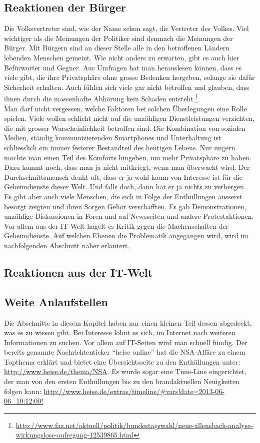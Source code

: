 \subsection{Reaktionen der Bürger}
Die Volksvertreter sind, wie der Name schon sagt, die Vertreter des Volkes. Viel wichtiger als die Meinungen der Politiker sind demnach die Meinungen der Bürger. Mit Bürgern sind an dieser Stelle alle in den betroffenen Ländern lebenden Menschen gemeint. Wie nicht anders zu erwarten, gibt es auch hier Befürworter und Gegner. Aus Umfragen hat man herauslesen können, dass es viele gibt, die ihre Privatsphäre ohne grosse Bedenken hergeben, solange sie dafür Sicherheit erhalten. Auch fühlen sich viele gar nicht betroffen und glauben, dass ihnen durch die massenhafte Abhörung kein Schaden entsteht.\footnote{\url{http://www.faz.net/aktuell/politik/bundestagswahl/neue-allensbach-analyse-wirkungslose-aufregung-12539865.html}}
\\
Man darf nicht vergessen, welche Faktoren bei solchen Überlegungen eine Rolle spielen. Viele wollen schlicht nicht auf die unzähligen Dienstleistungen verzichten, die mit grosser Warscheinlichkeit betroffen sind. Die Kombination von sozialen Medien, ständig kommunizierenden Smartphones und Unterhaltung ist schliesslich ein immer festerer Bestandteil des heutigen Lebens. Nur ungern möchte man einen Teil des Komforts hingeben, um mehr Privatsphäre zu haben. Dazu kommt noch, dass man ja nicht mitkriegt, wenn man überwacht wird. Der Durchschnittsmensch denkt oft, dass er ja wohl kaum von Interesse ist für die Geheimdienste dieser Welt. Und falls doch, dann hat er ja nichts zu verbergen.
\\
Es gibt aber auch viele Menschen, die sich in Folge der Enthüllungen äusserst besorgt zeigten und ihren Sorgen Gehör verschafften. Es gab Demonstrationen, unzählige Diskussionen in Foren und auf Newsseiten und andere Protestaktionen. Vor allem aus der IT-Welt hagelt es Kritik gegen die Machenschaften der Geheimdienste. Auf welchen Ebenen die Problematik angegangen wird, wird im nachfolgenden Abschnitt näher erläutert.

\subsection{Reaktionen aus der IT-Welt}

\subsection{Weite Anlaufstellen}
Die Abschnitte in diesem Kapitel haben nur einen kleinen Teil dessen abgedeckt, was es zu wissen gibt. Bei Interesse lohnt es sich, im Internet nach weiteren Informationen zu suchen. Vor allem auf IT-Seiten wird man schnell fündig. Der bereits genannte Nachrichtenticker ``heise online'' hat die NSA-Affäre zu einem Topthema erklärt und bietet eine Übersichtsseite zu den Enthüllungen unter: \url{http://www.heise.de/thema/NSA}. Es wurde sogar eine Time-Line eingerichtet, der man von den ersten Enthüllungen bis zu den brandaktuellen Neuigkeiten folgen kann: \url{http://www.heise.de/extras/timeline/#vars!date=2013-06-06_10:12:00!}